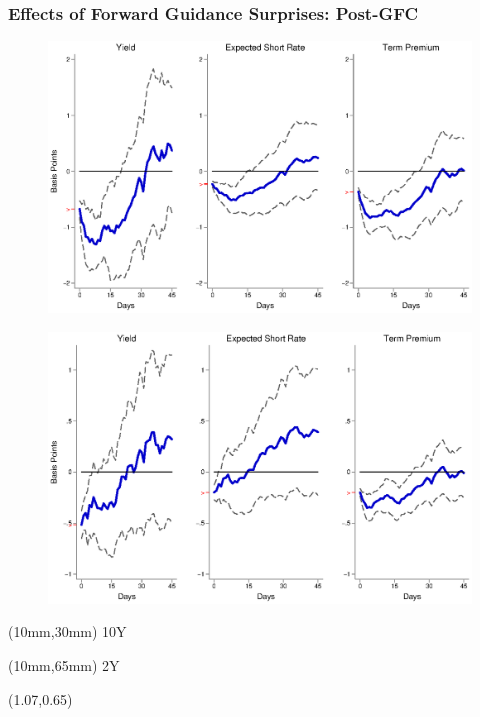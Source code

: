 \documentclass[12pt, aspectratio=169, xcolor=dvipsnames]{beamer}
\begin{document}
\begin{frame}[label=FGUSpost]
\frametitle{Effects of Forward Guidance Surprises: Post-GFC}
\begin{figure}[!htbp]
\begin{center} %
\includegraphics[trim={0cm 0cm 0cm 0cm},clip,height=0.45\textheight,width=0.85\linewidth]{../Figures/LPs/LagDep-FX/Path/US/DCMP/PathUSDnomyptp120mPost.eps}
\par\end{center}
\end{figure}
\vspace{-0.5cm}
\begin{figure}[!htbp]
\begin{center} %
\includegraphics[trim={0cm 0cm 0cm 0.76cm},clip,height=0.45\textheight,width=0.85\linewidth]{../Figures/LPs/LagDep-FX/Path/US/DCMP/PathUSDnomyptp24mPost.eps}
\par\end{center}
\end{figure}
\begin{textblock*}{8mm}(10mm,30mm)
\small 10Y
\end{textblock*}
\begin{textblock*}{8mm}(10mm,65mm)
\small 2Y
\end{textblock*}
\begin{textblock*}{5cm}(1.07\textwidth,0.65\textheight)
\hyperlink{FGEMpost}{}
\end{textblock*}
\end{frame}
\end{document}
